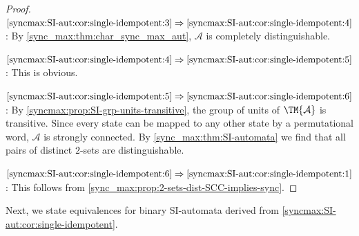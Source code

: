 \begin{proof}
	$\ref{syncmax:SI-aut:cor:single-idempotent:3} \Rightarrow \ref{syncmax:SI-aut:cor:single-idempotent:4}$: By \cref{sync_max:thm:char_sync_max_aut}, $\mathcal A$ is completely distinguishable.
	
	$\ref{syncmax:SI-aut:cor:single-idempotent:4} \Rightarrow \ref{syncmax:SI-aut:cor:single-idempotent:5}$: This is obvious.
	
	$\ref{syncmax:SI-aut:cor:single-idempotent:5} \Rightarrow \ref{syncmax:SI-aut:cor:single-idempotent:6}$:  
	By \cref{syncmax:prop:SI-grp-units-transitive}, the group of units of $\TM{\mathcal A}$
	is transitive.
	Since every state can be mapped to any other state
	by a permutational word, $\mathcal A$
	is strongly connected.
	By \cref{sync_max:thm:SI-automata} we find
	that all pairs of distinct $2$-sets are distinguishable.	
	
	$\ref{syncmax:SI-aut:cor:single-idempotent:6} \Rightarrow \ref{syncmax:SI-aut:cor:single-idempotent:1}$: 
	This follows from \cref{sync_max:prop:2-sets-dist-SCC-implies-sync}.
\end{proof}

Next, we state equivalences for binary SI-automata
derived from \cref{syncmax:SI-aut:cor:single-idempotent}.

